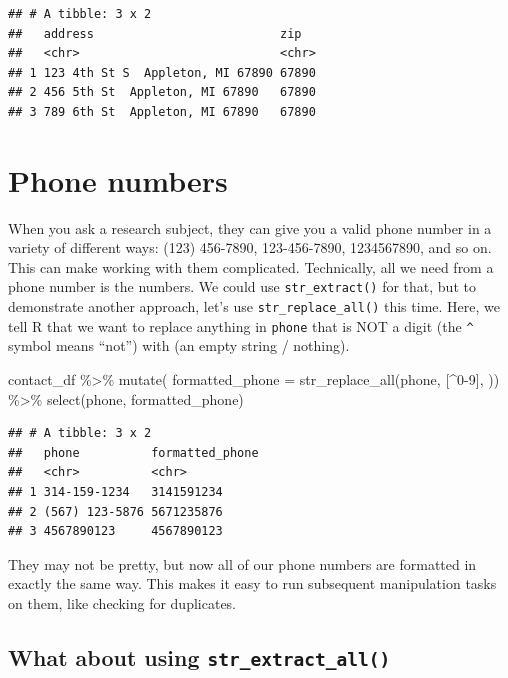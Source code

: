 \documentclass[
]{book}
\newenvironment{Shaded}{\begin{snugshade}}{\end{snugshade}}
\newcommand{\AttributeTok}[1]{\textcolor[rgb]{0.77,0.63,0.00}{#1}}
\newcommand{\FunctionTok}[1]{\textcolor[rgb]{0.00,0.00,0.00}{#1}}
\newcommand{\NormalTok}[1]{#1}
\newcommand{\SpecialCharTok}[1]{\textcolor[rgb]{0.00,0.00,0.00}{#1}}
\newcommand{\StringTok}[1]{\textcolor[rgb]{0.31,0.60,0.02}{#1}}
\begin{document}
\begin{verbatim}
## # A tibble: 3 x 2
##   address                          zip  
##   <chr>                            <chr>
## 1 123 4th St S  Appleton, MI 67890 67890
## 2 456 5th St  Appleton, MI 67890   67890
## 3 789 6th St  Appleton, MI 67890   67890
\end{verbatim}

\hypertarget{phone-numbers}{%
\section{Phone numbers}\label{phone-numbers}}

When you ask a research subject, they can give you a valid phone number in a variety of different ways: (123) 456-7890, 123-456-7890, 1234567890, and so on. This can make working with them complicated. Technically, all we need from a phone number is the numbers. We could use \texttt{str\_extract()} for that, but to demonstrate another approach, let's use \texttt{str\_replace\_all()} this time. Here, we tell R that we want to replace anything in \texttt{phone} that is NOT a digit (the \texttt{\^{}} symbol means ``not'') with \texttt{\textquotesingle{}\textquotesingle{}} (an empty string / nothing).

\begin{Shaded}
\begin{Highlighting}[]
\NormalTok{contact\_df }\SpecialCharTok{\%\textgreater{}\%} 
  \FunctionTok{mutate}\NormalTok{(}
    \AttributeTok{formatted\_phone =} \FunctionTok{str\_replace\_all}\NormalTok{(phone, }\StringTok{\textquotesingle{}[\^{}0{-}9]\textquotesingle{}}\NormalTok{, }\StringTok{\textquotesingle{}\textquotesingle{}}\NormalTok{)) }\SpecialCharTok{\%\textgreater{}\%} 
  \FunctionTok{select}\NormalTok{(phone, formatted\_phone)}
\end{Highlighting}
\end{Shaded}

\begin{verbatim}
## # A tibble: 3 x 2
##   phone          formatted_phone
##   <chr>          <chr>          
## 1 314-159-1234   3141591234     
## 2 (567) 123-5876 5671235876     
## 3 4567890123     4567890123
\end{verbatim}

They may not be pretty, but now all of our phone numbers are formatted in exactly the same way. This makes it easy to run subsequent manipulation tasks on them, like checking for duplicates.

\hypertarget{what-about-using-str_extract_all}{%
\subsection{\texorpdfstring{What about using \texttt{str\_extract\_all()}}{What about using str\_extract\_all()}}\label{what-about-using-str_extract_all}}
\end{document}
